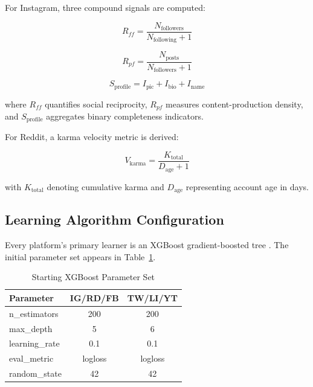 \documentclass[conference]{IEEEtran}
\begin{document}
For Instagram, three compound signals are computed:

\begin{equation}
R_{ff} = \frac{N_{\text{followers}}}{N_{\text{following}} + 1}
\end{equation}

\begin{equation}
R_{pf} = \frac{N_{\text{posts}}}{N_{\text{followers}} + 1}
\end{equation}

\begin{equation}
S_{\text{profile}} = I_{\text{pic}} + I_{\text{bio}} + I_{\text{name}}
\end{equation}

\noindent where $R_{ff}$ quantifies social reciprocity, $R_{pf}$ measures content-production density, and $S_{\text{profile}}$ aggregates binary completeness indicators.

For Reddit, a karma velocity metric is derived:

\begin{equation}
V_{\text{karma}} = \frac{K_{\text{total}}}{D_{\text{age}} + 1}
\end{equation}

\noindent with $K_{\text{total}}$ denoting cumulative karma and $D_{\text{age}}$ representing account age in days.

\subsection{Learning Algorithm Configuration}

Every platform's primary learner is an XGBoost gradient-boosted tree \cite{chen2016xgboost}. The initial parameter set appears in Table~\ref{tab:hyperparams}.

\begin{table}[htbp]
\caption{Starting XGBoost Parameter Set}
\label{tab:hyperparams}
\centering
\begin{tabular}{lcc}
\toprule
\textbf{Parameter} & \textbf{IG/RD/FB} & \textbf{TW/LI/YT} \\
\midrule
n\_estimators & 200 & 200 \\
max\_depth & 5 & 6 \\
learning\_rate & 0.1 & 0.1 \\
eval\_metric & logloss & logloss \\
random\_state & 42 & 42 \\
\bottomrule
\end{tabular}
\end{table}
\end{document}

